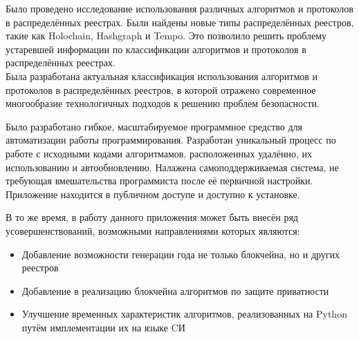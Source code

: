 


Было проведено исследование использования различных алгоритмов и протоколов в
распределённых реестрах. Были найдены новые типы распределённых реестров, такие
как Holochain, Hashgraph и Tempo. Это позволило решить проблему устаревшей
информации по классификации алгоритмов и протоколов в распределённых реестрах.\\
Была разработана актуальная классификация использования алгоритмов и протоколов
в распределённых реестров, в которой отражено современное многообразие
технологичных подходов к решению проблем безопасности.

Было разработано гибкое, масштабируемое программное средство для автоматизации
работы программирования. Разработан уникальный процесс по работе с исходными
кодами алгоритмамов, расположенных удалённо, их использованию и автообновлению.
Налажена самоподдерживаемая система, не требующая вмешательства программиста
после её первичной настройки. Приложение находится в публичном доступе и
доступно к
установке.

В то же время, в работу данного приложения может быть внесён ряд
усовершенствований, возможными направлениями которых являются:
\begin{itemize}
    \item Добавление возможности генерации года не только блокчейна, но и
          других реестров
    \item Добавление в реализацию блокчейна алгоритмов по защите приватности
    \item Улучшение временных характеристик алгоритмов, реализованных на Python
          путём имплементации их на языке CИ
\end{itemize}


